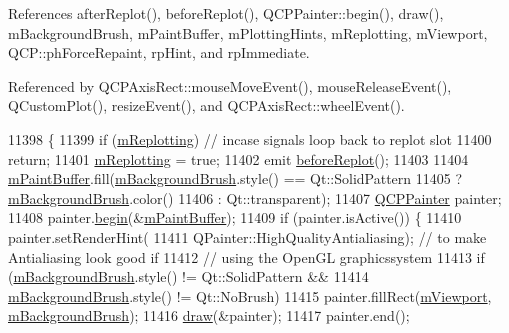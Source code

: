 References after\+Replot(), before\+Replot(), Q\+C\+P\+Painter\+::begin(), draw(), m\+Background\+Brush, m\+Paint\+Buffer, m\+Plotting\+Hints, m\+Replotting, m\+Viewport, Q\+C\+P\+::ph\+Force\+Repaint, rp\+Hint, and rp\+Immediate.



Referenced by Q\+C\+P\+Axis\+Rect\+::mouse\+Move\+Event(), mouse\+Release\+Event(), Q\+Custom\+Plot(), resize\+Event(), and Q\+C\+P\+Axis\+Rect\+::wheel\+Event().


\begin{DoxyCode}
11398                                                                    \{
11399   \textcolor{keywordflow}{if} (\hyperlink{class_q_custom_plot_ab30daeca6612c3948afd368dce5f1c39}{mReplotting}) \textcolor{comment}{// incase signals loop back to replot slot}
11400     \textcolor{keywordflow}{return};
11401   \hyperlink{class_q_custom_plot_ab30daeca6612c3948afd368dce5f1c39}{mReplotting} = \textcolor{keyword}{true};
11402   emit \hyperlink{class_q_custom_plot_a0cd30e29b73efd6afe096e44bc5956f5}{beforeReplot}();
11403 
11404   \hyperlink{class_q_custom_plot_a753630df96e0672098d9e88bd41d1913}{mPaintBuffer}.fill(\hyperlink{class_q_custom_plot_a3aef5de4ac012178e3293248e9c63737}{mBackgroundBrush}.style() == Qt::SolidPattern
11405                         ? \hyperlink{class_q_custom_plot_a3aef5de4ac012178e3293248e9c63737}{mBackgroundBrush}.color()
11406                         : Qt::transparent);
11407   \hyperlink{class_q_c_p_painter}{QCPPainter} painter;
11408   painter.\hyperlink{class_q_c_p_painter_a0a41146ccd619dceab6e25ec7b46b044}{begin}(&\hyperlink{class_q_custom_plot_a753630df96e0672098d9e88bd41d1913}{mPaintBuffer});
11409   \textcolor{keywordflow}{if} (painter.isActive()) \{
11410     painter.setRenderHint(
11411         QPainter::HighQualityAntialiasing); \textcolor{comment}{// to make Antialiasing look good if}
11412                                             \textcolor{comment}{// using the OpenGL graphicssystem}
11413     \textcolor{keywordflow}{if} (\hyperlink{class_q_custom_plot_a3aef5de4ac012178e3293248e9c63737}{mBackgroundBrush}.style() != Qt::SolidPattern &&
11414         \hyperlink{class_q_custom_plot_a3aef5de4ac012178e3293248e9c63737}{mBackgroundBrush}.style() != Qt::NoBrush)
11415       painter.fillRect(\hyperlink{class_q_custom_plot_ac0a7c38a715526c257cff95774f83ab6}{mViewport}, \hyperlink{class_q_custom_plot_a3aef5de4ac012178e3293248e9c63737}{mBackgroundBrush});
11416     \hyperlink{class_q_custom_plot_ad7a7d878bf050f101a43008e7d8fdb52}{draw}(&painter);
11417     painter.end();

\end{DoxyCode}
